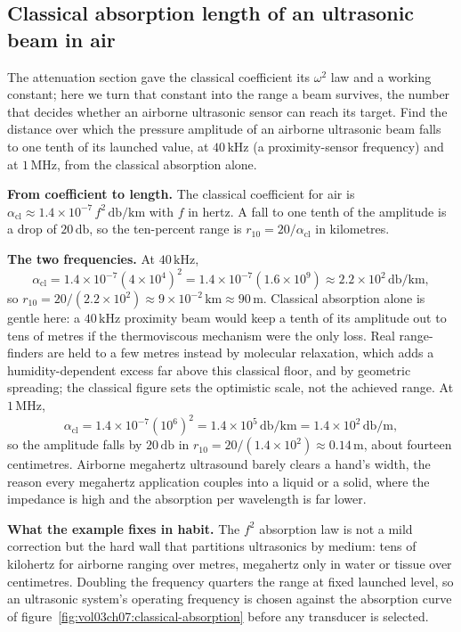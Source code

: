 \subsection{Classical absorption length of an ultrasonic beam in air}

The attenuation section gave the classical coefficient its $\omega^2$ law
and a working constant; here we turn that constant into the range a beam
survives, the number that decides whether an airborne ultrasonic sensor can
reach its target. Find the distance over which the pressure amplitude of an
airborne ultrasonic beam falls to one tenth of its launched value, at
$40\,\si{\kilo\hertz}$ (a proximity-sensor frequency) and at
$1\,\si{\mega\hertz}$, from the classical absorption alone.

\textbf{From coefficient to length.} The classical coefficient for air is
$\alpha_{\mathrm{cl}}\approx 1.4\times 10^{-7}\,f^2\,\si{\decibel\per\kilo
\meter}$ with $f$ in hertz. A fall to one tenth of the amplitude is a drop
of $20\,\si{\decibel}$, so the ten-percent range is $r_{10} =
20/\alpha_{\mathrm{cl}}$ in kilometres.

\textbf{The two frequencies.} At $40\,\si{\kilo\hertz}$,
\[
\alpha_{\mathrm{cl}} = 1.4\times 10^{-7}(4\times 10^{4})^2
                     = 1.4\times 10^{-7}(1.6\times 10^{9})
                     \approx 2.2\times 10^{2}\,\si{\decibel\per\kilo\meter},
\]
so $r_{10} = 20/(2.2\times 10^{2}) \approx 9\times 10^{-2}\,\si{\kilo\meter}
\approx 90\,\si{\meter}$. Classical absorption alone is gentle here: a
$40\,\si{\kilo\hertz}$ proximity beam would keep a tenth of its amplitude
out to tens of metres if the thermoviscous mechanism were the only loss.
Real range-finders are held to a few metres instead by molecular
relaxation, which adds a humidity-dependent excess far above this classical
floor, and by geometric spreading; the classical figure sets the optimistic
scale, not the achieved range. At $1\,\si{\mega\hertz}$,
\[
\alpha_{\mathrm{cl}} = 1.4\times 10^{-7}(10^{6})^2
                     = 1.4\times 10^{5}\,\si{\decibel\per\kilo\meter}
                     = 1.4\times 10^{2}\,\si{\decibel\per\meter},
\]
so the amplitude falls by $20\,\si{\decibel}$ in
$r_{10} = 20/(1.4\times 10^{2}) \approx 0.14\,\si{\meter}$,
about fourteen centimetres. Airborne megahertz ultrasound barely clears a
hand's width, the reason every megahertz application couples into a liquid or a
solid, where the impedance is high and the absorption per wavelength is far
lower.

\textbf{What the example fixes in habit.} The $f^2$ absorption law is not a
mild correction but the hard wall that partitions ultrasonics by medium:
tens of kilohertz for airborne ranging over metres, megahertz only in
water or tissue over centimetres. Doubling the frequency quarters the
range at fixed launched level, so an ultrasonic system's operating
frequency is chosen against the absorption curve of
figure~\ref{fig:vol03ch07:classical-absorption} before any transducer is
selected.

